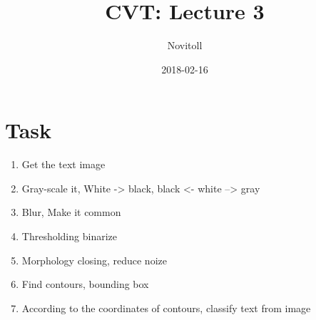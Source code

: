 \documentclass[11pt]{article}
\title{CVT: Lecture 3}
\date{2018-02-16}
\author{Novitoll}
\begin{document}
    \maketitle

    \section{Task}
    \begin{enumerate}
        \item Get the text image
        \item Gray-scale it, White -> black, black <- white --> gray
        \item Blur, Make it common
        \item Thresholding binarize
        \item Morphology closing, reduce noize
        \item Find contours, bounding box
        \item According to the coordinates of contours, classify text from image
    \end{enumerate}
\end{document}

